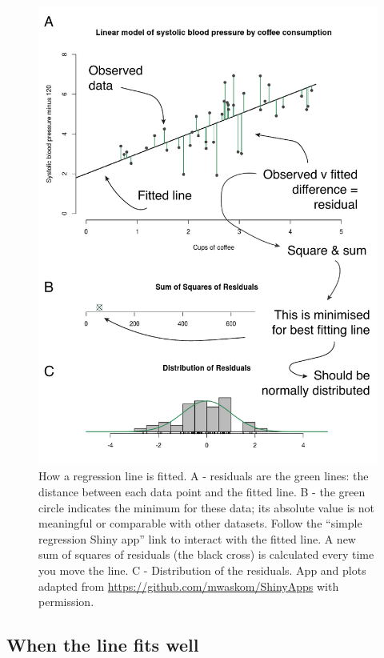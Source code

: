 \documentclass[
  12pt,
  krantz2]{krantz}
\begin{document}
\begin{figure}
\centering
\includegraphics{images/chapter07/2_residuals.pdf}
\caption{\label{fig:chap07-fig-residuals}How a regression line is fitted. A - residuals are the green lines: the distance between each data point and the fitted line. B - the green circle indicates the minimum for these data; its absolute value is not meaningful or comparable with other datasets. Follow the ``simple regression Shiny app'' link to interact with the fitted line. A new sum of squares of residuals (the black cross) is calculated every time you move the line. C - Distribution of the residuals. App and plots adapted from \url{https://github.com/mwaskom/ShinyApps} with permission.}
\end{figure}

\hypertarget{when-the-line-fits-well}{%
\subsection{When the line fits well}\label{when-the-line-fits-well}}
\end{document}
